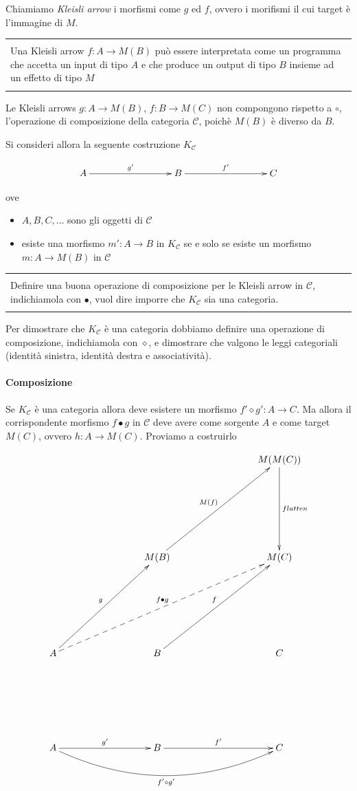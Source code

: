 \documentclass[12pt]{article}
\newenvironment{demo}
    {\begin{center}
    \begin{tabular}{|p{0.9\textwidth}|}
    \hline\\
    }
    {
    \\\\\hline
    \end{tabular}
    \end{center}
    }
\begin{document}
Chiamiamo \emph{Kleisli arrow} i morfismi come $g$ ed $f$, ovvero i morifismi il cui target è l'immagine di $M$.

\begin{demo}
Una Kleisli arrow $f: A \rightarrow M(B)$ può essere interpretata come un programma che accetta un input di tipo $A$ e che produce un output di tipo $B$ insieme ad un effetto di tipo $M$
\end{demo}

Le Kleisli arrows $g: A \rightarrow M(B)$, $f: B \rightarrow M(C)$ non compongono rispetto a $\circ$, l'operazione di composizione della categoria $\mathcal{C}$,
poichè $M(B)$ è diverso da $B$.

Si consideri allora la seguente costruzione $K_{\mathcal{C}}$

\[
\xymatrixrowsep{3cm}
\xymatrixcolsep{3cm}
\xymatrix{
  A \ar[r]^{g'} & B \ar[r]^{f'} & C
}
\]

ove

\begin{itemize}
  \item $A, B, C, \ldots$ sono gli oggetti di $\mathcal{C}$
  \item esiste una morfismo $m': A \rightarrow B$ in $K_{\mathcal{C}}$ se e solo se esiste un morfismo $m: A \rightarrow M(B)$ in $\mathcal{C}$
\end{itemize}

\begin{demo}
Definire una buona operazione di composizione per le Kleisli arrow in $\mathcal{C}$, indichiamola con $\bullet$, vuol dire imporre che $K_{\mathcal{C}}$ sia una categoria.
\end{demo}

Per dimostrare che $K_{\mathcal{C}}$ è una categoria dobbiamo definire una operazione di composizione, indichiamola con $\diamond$,
e dimostrare che valgono le leggi categoriali (identità sinistra, identità destra e associatività).

\paragraph{Composizione}

Se $K_{\mathcal{C}}$ è una categoria allora deve esistere un morfismo $f' \diamond g': A \rightarrow C$.
Ma allora il corrispondente morfismo $f \bullet g$ in $\mathcal{C}$ deve avere come sorgente $A$ e come target $M(C)$, ovvero $h: A \rightarrow M(C)$.
Proviamo a costruirlo

\[
\xymatrixrowsep{3cm}
\xymatrixcolsep{3cm}
\xymatrix{
  && M(M(C)) \ar[d]^{flatten} \\
  & M(B) \ar[ur]^{M(f)} & M(C) \\
  A \ar[ur]^g \ar@{-->}[urr]^{f \bullet g} & B \ar[ur]^f & C \\
  A \ar[r]^{g'} \ar@/_1cm/[rr]_{f' \diamond g'} & B \ar[r]^{f'} & C
}
\]
\end{document}
